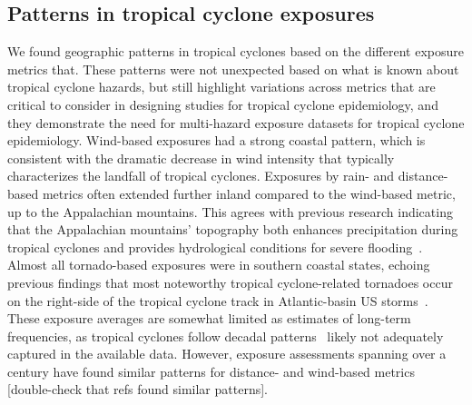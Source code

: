 \subsection*{Patterns in tropical cyclone exposures}

We found geographic patterns in tropical cyclones based on the different
exposure metrics that. These patterns were not unexpected based on what is
known about tropical cyclone hazards, but still highlight variations across
metrics that are critical to consider in designing studies for tropical cyclone
epidemiology, and they demonstrate the need for multi-hazard exposure datasets
for tropical cyclone epidemiology. Wind-based exposures had a strong coastal
pattern, which is consistent with the dramatic decrease in wind intensity that
typically characterizes the landfall of tropical cyclones. Exposures by rain-
and distance-based metrics often extended further inland compared to the
wind-based metric, up to the Appalachian mountains. This agrees with previous
research indicating that the Appalachian mountains' topography both enhances
precipitation during tropical cyclones and provides hydrological conditions for
severe flooding~\parencite{rees2001}.  Almost all tornado-based exposures were
in southern coastal states, echoing previous findings that most noteworthy
tropical cyclone-related tornadoes occur on the right-side of the tropical
cyclone track in Atlantic-basin \ac{US} storms~\parencite{moore2012}.  These
exposure averages are somewhat limited as estimates of long-term frequencies,
as tropical cyclones follow decadal patterns~\parencite{kossin2007more} likely
not adequately captured in the available data. However, exposure assessments
spanning over a century have found similar patterns for distance- and
wind-based metrics~\textcite{zandbergen2009, kruk2010} [double-check that refs
found similar patterns].

\begin{comment}
However, these frequency maps, together with evidence from
specific tropical cyclones (Figures~\ref{fig:ivanexposure}
and~\ref{fig:jaccard}),  do illustrate the potential for strong differences in
spatial patterns in tropical cyclone exposures, depending on which tropical
cyclone hazards are considered.  A few previous studies have sought to
determine county-level exposure to tropical cyclones over multi-year periods,
including~\textcite{zandbergen2009}, which estimated exposure in \ac{US}
counties to all \ac{US} landfalling Atlantic-basin tropical cyclones
between~1851 and~2003, using both a distance-based metric and a metric that
combined distance and windspeed, and~\textcite{kruk2010}, which explored
exposure to hurricane-related winds in the \ac{US}, including inland areas,
for~1900\,--\,2008.  Our results suggest that such exposure assessments may
perform well in capturing some tropical cyclone hazards (e.g., wind), but
likely miss other potentially dangerous tropical cyclone exposures, especially
for hazards that repeatedly threaten northern or inland counties (e.g., rain,
flooding).
\end{comment}

